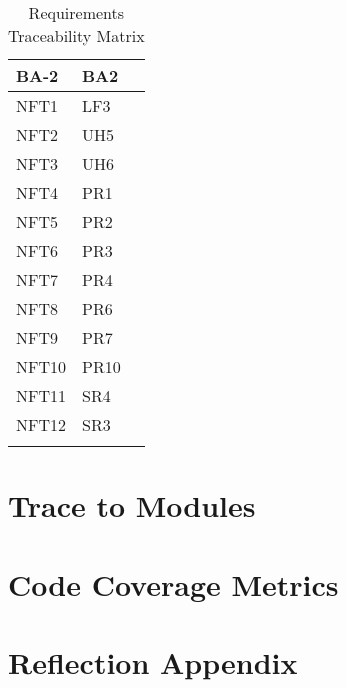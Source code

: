 \documentclass[12pt, titlepage]{article}
\begin{document}
\begin{longtable}{| p{} | p{} | p{}|}
  \hline
  BA-2 & BA2 &\\
  \hline
  NFT1 & LF3 &\\
  \hline
  NFT2 & UH5 &\\
  \hline
  NFT3 & UH6 &\\
  \hline
  NFT4 & PR1 &\\
  \hline
  NFT5 & PR2 &\\
  \hline
  NFT6 & PR3 &\\
  \hline
  NFT7 & PR4 &\\
  \hline
  NFT8 & PR6 &\\
  \hline
  NFT9 & PR7 &\\
  \hline
  NFT10 & PR10 &\\
  \hline
  NFT11 & SR4 &\\
  \hline
  NFT12 & SR3 &\\
  \hline
\caption{Requirements Traceability Matrix}
\end{longtable}
		
\section{Trace to Modules}		

\section{Code Coverage Metrics}

\appendix
\section{Reflection Appendix}




\nocite{*}
\end{document}
